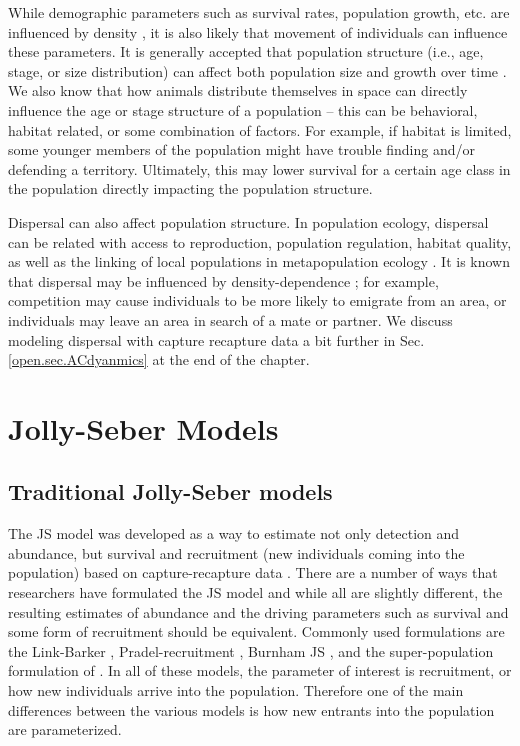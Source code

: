 While demographic parameters such as survival rates, population
growth, etc. are influenced by density \citep{fowler:1981,
  murdoch:1994, saether_etal:2002}, it is also likely that movement
of individuals can influence these parameters.  It is generally
accepted that population structure (i.e., age, stage, or size
distribution) can affect both population size and growth over time
\citep{caswell_werner:1978}.  We also know that how animals distribute
themselves in space can directly influence the age or stage structure
of a population -- this can be behavioral, habitat related, or some
combination of factors.  For example, if habitat is limited, some
younger members of the population might have trouble finding and/or
defending a territory.  Ultimately, this may lower survival for a
certain age class in the population directly impacting the population
structure.

Dispersal can also affect population structure.  In population
ecology, dispersal can be related with access to reproduction,
population regulation, habitat quality, as well as the linking of
local populations in metapopulation ecology \citep{clobert_etal:2001,
  ovaskainen:2004, ovaskainen_etal:2008}.  It is known that dispersal
may be influenced by density-dependence \citep{matthysen:2005}; for
example, competition may cause individuals to be more likely to
emigrate from an area, or individuals may leave an area in search of a
mate or partner.  We discuss modeling dispersal with capture recapture
data a bit further in Sec. \ref{open.sec.ACdyanmics} at the end of the
chapter.


\section{Jolly-Seber Models}

\subsection{Traditional Jolly-Seber models}

The JS model was developed as a way to estimate not only detection and
abundance, but survival and recruitment (new individuals coming into
the population) based on capture-recapture data \citep{jolly:1965,
  seber:1965}.  There are a number of ways that researchers have
formulated the JS model \citep{cooch_white:2006} and while all are
slightly different, the resulting estimates of abundance and the
driving parameters such as survival and some form of recruitment
should be equivalent.  Commonly used formulations are the Link-Barker
\citep{link_barker:2005}, Pradel-recruitment \citep{pradel:1996},
Burnham JS \citep{burnham:1997}, and the super-population formulation
of \citet{schwarz_arnason:1996}.  In all of these models, the
parameter of interest is recruitment, or how new individuals arrive
into the population.  Therefore one of the main differences between
the various models is how new entrants into the population are
parameterized.


